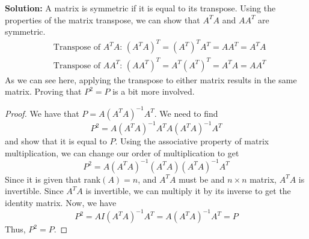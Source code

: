 \documentclass{article}
\begin{document}
\vspace{0.5cm}
\noindent\textbf{Solution:} A matrix is symmetric if it is equal to its transpose.
Using the properties of the matrix transpose, we can show that $A^T A$ and $AA^T$ are symmetric.
\begin{align*}
    &\text{Transpose of $A^T A$: } (A^T A)^T = (A^T)^T A^T = A A^T = A^T A \\
    &\text{Transpose of $A A^T$: } (AA^T)^T = A^T (A^T)^T = A^T A = A A^T
\end{align*}
As we can see here, applying the transpose to either matrix results in the same matrix.
Proving that $P^2 = P$ is a bit more involved.
\begin{proof}
    We have that $P = A(A^T A)^{-1}A^T$.
    We need to find $$P^2 = A(A^T A)^{-1}A^T A(A^T A)^{-1}A^T$$ and show that it is equal to $P$.
    Using the associative property of matrix multiplication, we can change our order of multiplication to get
    $$P^2 = A(A^T A)^{-1}(A^T A)(A^T A)^{-1}A^T$$
    Since it is given that rank$(A) = n$, and $A^T A$ must be and $n \times n$ matrix, $A^T A$ is invertible.
    Since $A^T A$ is invertible, we can multiply it by its inverse to get the identity matrix.
    Now, we have
    $$P^2 = A I (A^T A)^{-1}A^T = A (A^T A)^{-1}A^T = P$$
    Thus, $P^2 = P$.
\end{proof}
\end{document}
